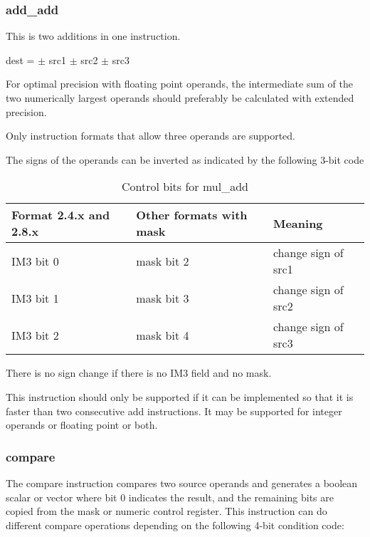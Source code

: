 \documentclass[forwardcom.tex]{subfiles}
\begin{document}
\subsubsection{add\_add}  \label{addAdd}
This is two additions in one instruction.
\vspace{2mm}

dest = $\pm$ src1 $\pm$ src2 $\pm$ src3
\vspace{2mm}

For optimal precision with floating point operands, the intermediate sum of the two numerically largest operands should preferably be calculated with extended precision.
\vspace{2mm}

Only instruction formats that allow three operands are supported.
\vspace{2mm}

The signs of the operands can be inverted as indicated by the following 3-bit code

\begin{longtable} {|p{20mm}|p{20mm}|p{75mm}|}
\caption{Control bits for mul\_add} 
\label{table:ControlBitsForMulAdd} \\
\endfirsthead
\endhead
\hline
\bfseries Format 2.4.x and 2.8.x & \bfseries Other formats with mask & \bfseries Meaning   \\
\hline
IM3 bit 0 & mask bit 2 & change sign of src1 \\
IM3 bit 1 & mask bit 3 & change sign of src2 \\
IM3 bit 2 & mask bit 4 & change sign of src3 \\
\hline
\end{longtable}

There is no sign change if there is no IM3 field and no mask. 
\vspace{2mm}

This instruction should only be supported if it can be implemented so that it is faster than two consecutive add instructions. It may be supported for integer operands or floating point or both.

\subsubsection{compare} \label{compare}
The compare instruction compares two source operands and generates a boolean scalar or vector where bit 0 indicates the result, and the remaining bits are copied from the mask or numeric control register. This instruction can do different compare operations depending on the following 4-bit condition code:
\end{document}
